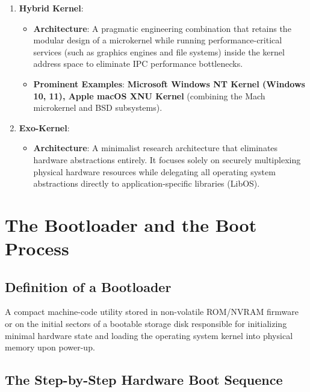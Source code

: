 \begin{enumerate}[leftmargin=1.5em]
    \item \textbf{Hybrid Kernel}:
    \begin{itemize}
        \item \textbf{Architecture}: A pragmatic engineering combination that retains the modular design of a microkernel while running performance-critical services (such as graphics engines and file systems) inside the kernel address space to eliminate IPC performance bottlenecks.
        \item \textbf{Prominent Examples}: \textbf{Microsoft Windows NT Kernel (Windows 10, 11), Apple macOS XNU Kernel} (combining the Mach microkernel and BSD subsystems).
    \end{itemize}

    \item \textbf{Exo-Kernel}:
    \begin{itemize}
        \item \textbf{Architecture}: A minimalist research architecture that eliminates hardware abstractions entirely. It focuses solely on securely multiplexing physical hardware resources while delegating all operating system abstractions directly to application-specific libraries (LibOS).
    \end{itemize}
\end{enumerate}

\section{The Bootloader and the Boot Process}

\subsection{Definition of a Bootloader}

\begin{definition}[Bootloader]
A compact machine-code utility stored in non-volatile ROM/NVRAM firmware or on the initial sectors of a bootable storage disk responsible for initializing minimal hardware state and loading the operating system kernel into physical memory upon power-up.
\end{definition}

\subsection{The Step-by-Step Hardware Boot Sequence}

